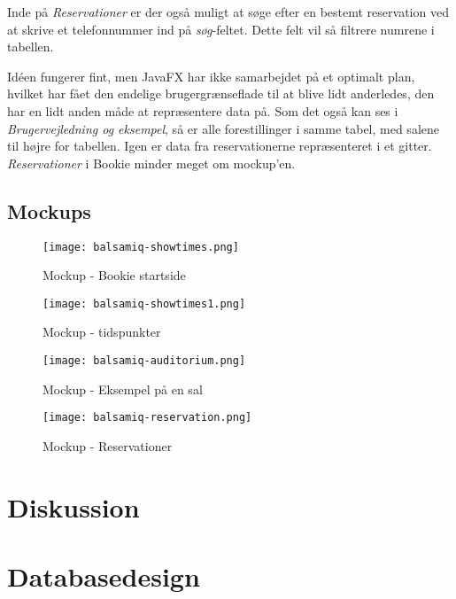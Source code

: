 Inde på \textit{Reservationer} er der også muligt at søge efter en bestemt reservation ved at skrive et telefonnummer ind på \textit{søg}-feltet. Dette felt vil så filtrere numrene i tabellen.

Idéen fungerer fint, men JavaFX har ikke samarbejdet på et optimalt plan, hvilket har fået den endelige brugergrænseflade til at blive lidt anderledes, den har en lidt anden måde at repræsentere data på. Som det også kan ses i \textit{Brugervejledning og eksempel}, så er alle forestillinger i samme tabel, med salene til højre for tabellen. Igen er data fra reservationerne repræsenteret i et gitter. \textit{Reservationer} i Bookie minder meget om mockup'en. 


\subsection{Mockups}

\begin{figure}[h]
  \centering
  \texttt{[image: balsamiq-showtimes.png]}
  \caption{Mockup - Bookie startside}
  \label{mockup: balsamiq-showtimes}
\end{figure}

\begin{figure}[h]
  \centering
  \texttt{[image: balsamiq-showtimes1.png]}
  \caption{Mockup - tidspunkter}
  \label{mockup: balsamiq-showtimes1}
\end{figure}

\begin{figure}[h]
  \centering
  \texttt{[image: balsamiq-auditorium.png]}
  \caption{Mockup - Eksempel på en sal}
  \label{mockup: balsamiq-auditorium}
\end{figure}

\begin{figure}[h]
  \centering
  \texttt{[image: balsamiq-reservation.png]}
  \caption{Mockup - Reservationer}
  \label{mockup: balsamiq-reservation}
\end{figure}

\section{Diskussion}

\section{Databasedesign}


